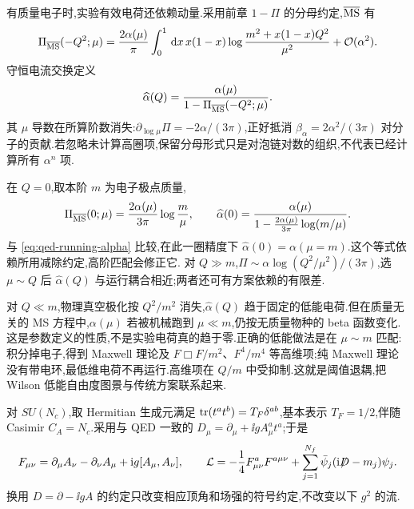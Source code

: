 有质量电子时,实验有效电荷还依赖动量.采用前章 $1-\Pi$ 的分母约定,$\overline{\rm MS}$ 有
\begin{equation}
 \Pi_{\overline{\rm MS}}(-Q^2;\mu)
   =\frac{2\alpha(\mu)}\pi\int_0^1\,\mathrm d x\,x(1-x)
             \log\frac{m^2+x(1-x)Q^2}{\mu^2}+\mathcal O(\alpha^2).
\end{equation}
守恒电流交换定义
\begin{equation}
 \widehat\alpha(Q)=\frac{\alpha(\mu)}
                 {1-\Pi_{\overline{\rm MS}}(-Q^2;\mu)}.
 \label{eq:qed-effective-ms-alpha}
\end{equation}
其 $\mu$ 导数在所算阶数消失:$\partial_{\log\mu}\Pi=-2\alpha/(3\pi)$,正好抵消 $\beta_\alpha=2\alpha^2/(3\pi)$ 对分子的贡献.若忽略未计算高圈项,保留分母形式只是对泡链对数的组织,不代表已经计算所有 $\alpha^n$ 项.

在 $Q=0$,取本阶 $m$ 为电子极点质量,
\begin{equation}
 \Pi_{\overline{\rm MS}}(0;\mu)=\frac{2\alpha(\mu)}{3\pi}\log\frac m\mu,
 \qquad
 \widehat\alpha(0)=\frac{\alpha(\mu)}
        {1-\tfrac{2\alpha(\mu)}{3\pi}\log(m/\mu)}.
\end{equation}
与 \eqref{eq:qed-running-alpha} 比较,在此一圈精度下
$\widehat\alpha(0)=\alpha(\mu=m)$.这个等式依赖所用减除约定,高阶匹配会修正它.
对 $Q\gg m$,$\Pi\sim\alpha\log(Q^2/\mu^2)/(3\pi)$,选 $\mu\sim Q$ 后 $\widehat\alpha(Q)$ 与运行耦合相近;两者还可有方案依赖的有限差.

对 $Q\ll m$,物理真空极化按 $Q^2/m^2$ 消失,$\widehat\alpha(Q)$ 趋于固定的低能电荷.但在质量无关的 MS 方程中,$\alpha(\mu)$ 若被机械跑到 $\mu\ll m$,仍按无质量物种的 beta 函数变化.这是参数定义的性质,不是实验电荷真的趋于零.正确的低能做法是在 $\mu\sim m$ 匹配:积分掉电子,得到 Maxwell 理论及 $F\Box F/m^2$、$F^4/m^4$ 等高维项;纯 Maxwell 理论没有带电环,最低维电荷不再运行.高维项在 $Q/m$ 中受抑制.这就是阈值退耦,把 Wilson 低能自由度图景与传统方案联系起来.


对 $SU(N_c)$,取 Hermitian 生成元满足
$\operatorname{tr}(t^at^b)=T_F\delta^{ab}$,基本表示 $T_F=1/2$,伴随 Casimir $C_A=N_c$.采用与 QED 一致的 $D_\mu=\partial_\mu+\ii gA_\mu^at^a$;于是
\begin{equation}
 F_{\mu\nu}=\partial_\mu A_\nu-\partial_\nu A_\mu+\mathrm i g[A_\mu,A_\nu],\qquad
 \mathcal L=-\frac14F_{\mu\nu}^aF^{a\mu\nu}
      +\sum_{j=1}^{N_f}\bar\psi_j(\mathrm i\mathord{\not\mathrel{D}}-m_j)\psi_j.
\end{equation}
换用 $D=\partial-\ii gA$ 的约定只改变相应顶角和场强的符号约定,不改变以下 $g^2$ 的流.

